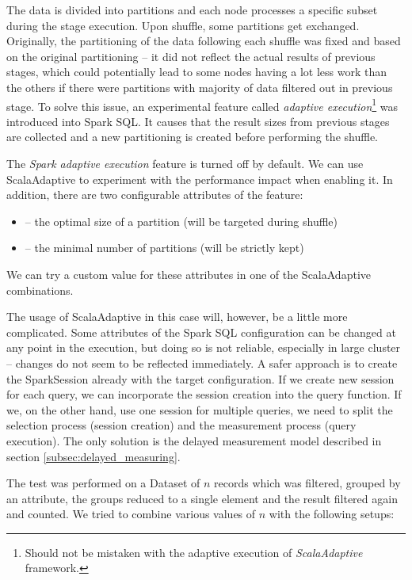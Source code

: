 The data is divided into partitions and each node processes a specific subset during the stage execution. Upon shuffle, some partitions get exchanged. Originally, the partitioning of the data following each shuffle was fixed and based on the original partitioning -- it did not reflect the actual results of previous stages, which could potentially lead  to some nodes having a lot less work than the others if there were partitions with majority of data filtered out in previous stage. To solve this issue, an experimental feature called \textit{adaptive execution}\footnote{Should not be mistaken with the adaptive execution of \textit{ScalaAdaptive} framework.} was introduced into Spark SQL. It causes that the result sizes from previous stages are collected and a new partitioning is created before performing the shuffle.

The \textit{Spark adaptive execution} feature is turned off by default. We can use ScalaAdaptive to experiment with the performance impact when enabling it. In addition, there are two configurable attributes of the feature:
\begin{itemize}
	\item {} -- the optimal size of a partition (will be targeted during shuffle)
	\item {} -- the minimal number of partitions (will be strictly kept)
\end{itemize}
We can try a custom value for these attributes in one of the ScalaAdaptive combinations.

The usage of ScalaAdaptive in this case will, however, be a little more complicated. Some attributes of the Spark SQL configuration can be changed at any point in the execution, but doing so is not reliable, especially in large cluster -- changes do not seem to be reflected immediately. A safer approach is to create the SparkSession already with the target configuration. If we create new session for each query, we can incorporate the session creation into the query function. If we, on the other hand, use one session for multiple queries, we need to split the selection process (session creation) and the measurement process (query execution). The only solution is the delayed measurement model described in section \ref{subsec:delayed_measuring}.

The test was performed on a Dataset of $n$ records which was filtered, grouped by an attribute, the groups reduced to a single element and the result filtered again and counted. We tried to combine various values of $n$ with the following setups:

